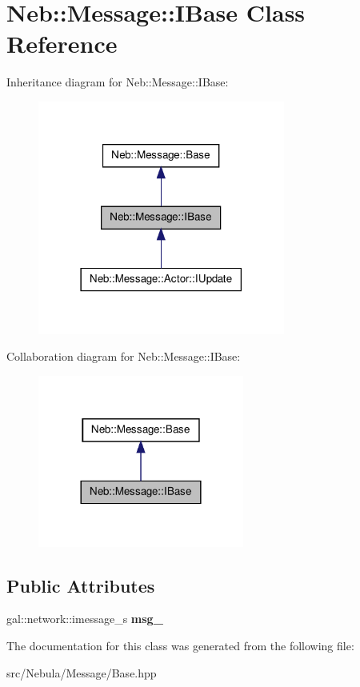 \hypertarget{classNeb_1_1Message_1_1IBase}{\section{\-Neb\-:\-:\-Message\-:\-:\-I\-Base \-Class \-Reference}
\label{classNeb_1_1Message_1_1IBase}
}


\-Inheritance diagram for \-Neb\-:\-:\-Message\-:\-:\-I\-Base\-:\nopagebreak
\begin{figure}[H]
\begin{center}
\leavevmode
\includegraphics[width=230pt]{classNeb_1_1Message_1_1IBase__inherit__graph}
\end{center}
\end{figure}


\-Collaboration diagram for \-Neb\-:\-:\-Message\-:\-:\-I\-Base\-:\nopagebreak
\begin{figure}[H]
\begin{center}
\leavevmode
\includegraphics[width=192pt]{classNeb_1_1Message_1_1IBase__coll__graph}
\end{center}
\end{figure}
\subsection*{\-Public \-Attributes}
\begin{DoxyCompactItemize}
\item 
\hypertarget{classNeb_1_1Message_1_1IBase_ad136b72f57b2130c836c7ba451124696}{gal\-::network\-::imessage\-\_\-s {\bfseries msg\-\_\-}}\label{classNeb_1_1Message_1_1IBase_ad136b72f57b2130c836c7ba451124696}

\end{DoxyCompactItemize}


\-The documentation for this class was generated from the following file\-:\begin{DoxyCompactItemize}
\item 
src/\-Nebula/\-Message/\-Base.\-hpp\end{DoxyCompactItemize}

